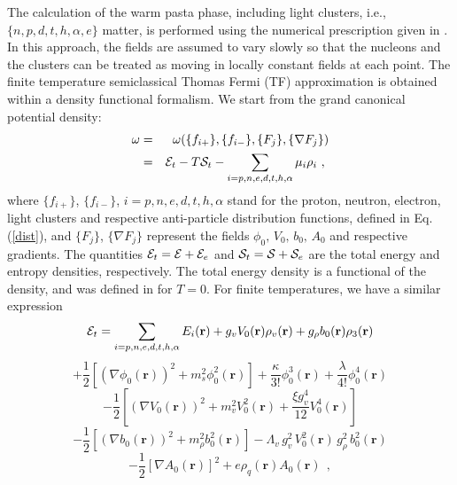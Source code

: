 \documentclass[aps,prc,nofootinbib,twocolumn,showpacs]{revtex4-1}
\begin{document}
The calculation of the warm pasta phase, including light clusters, i.e.,
$\{ n, p, d, t, h,\alpha, e\}$ matter, is 
performed  using the numerical prescription given in
\cite{pasta1}. In this approach, the fields are assumed to vary slowly so that
the nucleons and the clusters can be treated as moving in locally constant fields at each point.
The finite temperature semiclassical Thomas Fermi (TF)  approximation
is obtained within a density functional formalism.
We start from the grand canonical potential density:
\begin{eqnarray}
 {\omega } &=& \omega ( \{f_{i+}\},\{f_{i-}\}, \{F_j\}, \{\nabla F_j\}
               )\nonumber\\
& =&
{\cal E}_t-T{\cal S}_t-\sum_{i=p,n,e,d,t,h,\alpha}\mu_i \rho_i ~ ,~
\label{grand}
\end{eqnarray}
where  $\{f_{i+}\}$, $\{f_{i-}\}$, $i=p,n,e,d,t,h,\alpha$  stand for the  proton,
neutron, electron, light clusters and respective
anti-particle distribution functions, defined in Eq. (\ref{dist}), 
and $ \{F_j\} $, $ \{\nabla F_j\}$  represent the fields $\phi_0,\,  V_0,
\, b_0, \,A_0$ and respective gradients.
The quantities
 ${\cal E}_t = {\cal E} +{\cal E}_e $  and ${\cal S}_t = {\cal S}
 +{\cal S}_e$ are
the total energy and entropy densities,
respectively. The total energy density  is a functional of the density, and was defined in \cite{pasta1} for
$T=0$. For finite temperatures, we have a similar expression
\begin{equation}
{\cal E}_{t}=
\sum_{i=p,n,e,d,t,h,\alpha} E_i(\mathbf r) +g_v V_0(\mathbf r)\rho_v(\mathbf r) + g_\rho b_0(\mathbf r) \rho_3 (\mathbf r)
 \nonumber 
\end{equation}
\begin{equation}
+\frac{1}{2} \left[(\nabla \phi_0(\mathbf r))^2 +  
m_s^2\phi_0^2(\mathbf r)\right]   
+\frac{\kappa}{3!} \phi_0^3(\mathbf r) 
+\frac{\lambda}{4!} \phi_0^4(\mathbf r) 
\nonumber 
\end{equation}
\begin{equation}
-\frac{1}{2}\left[(\nabla V_0(\mathbf r))^2 +m_v^2 V_0^2(\mathbf r)
+\frac{\xi g_v^4}{12} V_0^4(\mathbf r)\right]
\nonumber 
\end{equation}
\begin{equation}
 -\frac{1}{2} \left[(\nabla b_0(\mathbf r) )^2 
+m_{\rho}^2 b_0^2(\mathbf r)\right]-\Lambda_v\,g_v^2\,V_0^2(\mathbf r)\,g_\rho^2\, b_0^2(\mathbf r)
\end{equation}
\begin{equation}
-\frac{1}{2}\left[\nabla A_0(\mathbf r) \right]^2 + e\rho_q(\mathbf r)A_0(\mathbf r) ~~,
\label{enfun} 
\end{equation}
\end{document}
